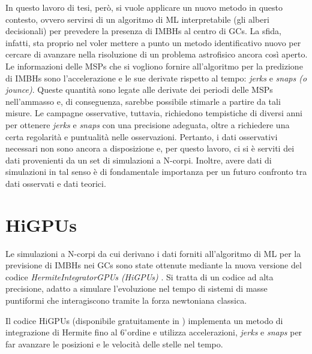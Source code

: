 In questo lavoro di tesi, però, si vuole applicare un nuovo metodo in questo contesto, ovvero servirsi di un algoritmo di ML interpretabile (gli alberi decisionali) per prevedere la presenza di IMBHs al centro di GCs. La sfida, infatti, sta proprio nel voler mettere a punto un metodo identificativo nuovo per cercare di avanzare nella risoluzione di un problema astrofisico ancora così aperto. Le informazioni delle MSPs che si vogliono fornire all'algoritmo per la predizione di IMBHs sono l'accelerazione e le sue derivate rispetto al tempo: \textit{jerks} e \textit{snaps (o jounce)}. Queste quantità sono legate alle derivate dei periodi delle MSPs nell'ammasso e, di conseguenza, sarebbe possibile stimarle a partire da tali misure. Le campagne osservative, tuttavia, richiedono tempistiche di diversi anni per ottenere \textit{jerks} e \textit{snaps} con una precisione adeguata, oltre a richiedere una certa regolarità e puntualità nelle osservazioni. Pertanto, i dati osservativi necessari non sono ancora a disposizione e, per questo lavoro, ci si è serviti dei dati provenienti da un set di simulazioni a N-corpi. Inoltre, avere dati di simulazioni in tal senso è di fondamentale importanza per un futuro confronto tra dati osservati e dati teorici. 

\section{HiGPUs}
Le simulazioni a N-corpi da cui derivano i dati forniti all'algoritmo di ML per la previsione di IMBHs nei GCs sono state ottenute mediante la nuova versione del codice \textit{HermiteIntegratorGPUs (HiGPUs)} \cite{capdolspe:paper}. Si tratta di un codice ad alta precisione, adatto a simulare l'evoluzione nel tempo di sistemi di masse puntiformi che interagiscono tramite la forza newtoniana classica.

Il codice HiGPUs (disponibile gratuitamente in \cite{HiGPUs:online}) implementa un metodo di integrazione di Hermite fino al $6^{\circ}$ordine e utilizza accelerazioni, \textit{jerks} e \textit{snaps} per far avanzare le posizioni e le velocità delle stelle nel tempo.

